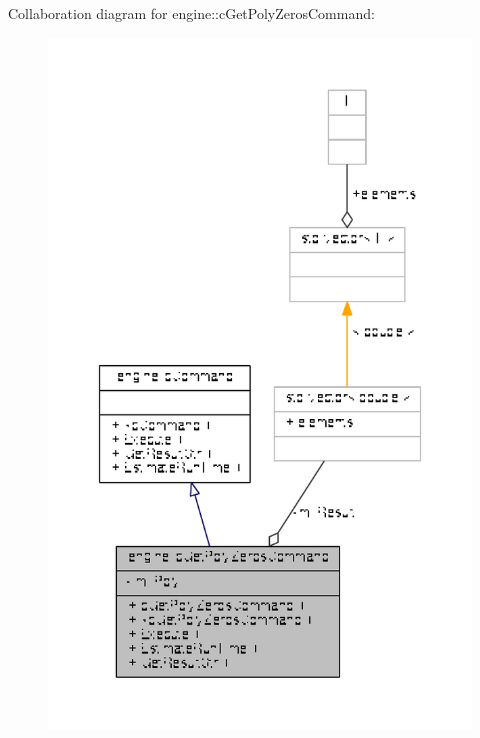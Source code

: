 Collaboration diagram for engine\-:\-:c\-Get\-Poly\-Zeros\-Command\-:
\nopagebreak
\begin{figure}[H]
\begin{center}
\leavevmode
\includegraphics[width=327pt]{classengine_1_1cGetPolyZerosCommand__coll__graph}
\end{center}
\end{figure}
